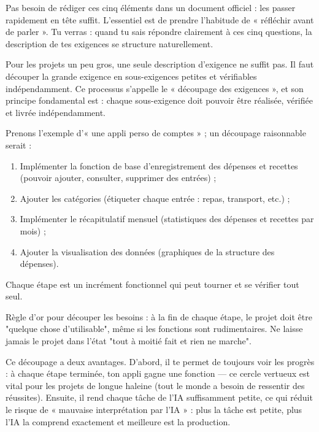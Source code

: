 Pas besoin de rédiger ces cinq éléments dans un document officiel : les passer rapidement en tête suffit. L'essentiel est de prendre l'habitude de « réfléchir avant de parler ». Tu verras : quand tu sais répondre clairement à ces cinq questions, la description de tes exigences se structure naturellement.


Pour les projets un peu gros, une seule description d'exigence ne suffit pas. Il faut découper la grande exigence en sous-exigences petites et vérifiables indépendamment. Ce processus s'appelle le « découpage des exigences », et son principe fondamental est : chaque sous-exigence doit pouvoir être réalisée, vérifiée et livrée indépendamment.

Prenons l'exemple d'« une appli perso de comptes » ; un découpage raisonnable serait :

\begin{enumerate}
  \item Implémenter la fonction de base d'enregistrement des dépenses et recettes (pouvoir ajouter, consulter, supprimer des entrées) ;
  \item Ajouter les catégories (étiqueter chaque entrée : repas, transport, etc.) ;
  \item Implémenter le récapitulatif mensuel (statistiques des dépenses et recettes par mois) ;
  \item Ajouter la visualisation des données (graphiques de la structure des dépenses).
\end{enumerate}

Chaque étape est un incrément fonctionnel qui peut tourner et se vérifier tout seul.

Règle d'or pour découper les besoins : à la fin de chaque étape, le projet doit être "quelque chose d'utilisable", même si les fonctions sont rudimentaires. Ne laisse jamais le projet dans l'état "tout à moitié fait et rien ne marche".

Ce découpage a deux avantages. D'abord, il te permet de toujours voir les progrès : à chaque étape terminée, ton appli gagne une fonction — ce cercle vertueux est vital pour les projets de longue haleine (tout le monde a besoin de ressentir des réussites). Ensuite, il rend chaque tâche de l'IA suffisamment petite, ce qui réduit le risque de « mauvaise interprétation par l'IA » : plus la tâche est petite, plus l'IA la comprend exactement et meilleure est la production.


